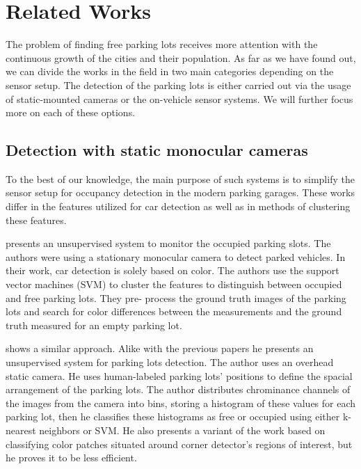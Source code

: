 \chapter{Related Works}
\label{cha:related_works}

The problem of finding free parking lots receives more attention with the
continuous growth of the cities and their population. As far as we have found
out, we can divide the works in the field in two main categories depending on
the sensor setup. The detection of the parking lots is either carried out via
the usage of static-mounted cameras or the on-vehicle sensor systems. We will
further focus more on each of these options.

\section{Detection with static monocular cameras} %
\label{sec:detection_with_monocular_cameras}

To the best of our knowledge, the main purpose of such systems is to simplify
the sensor setup for occupancy detection in the modern parking garages. These
works differ in the features utilized for car detection as well as in methods
of clustering these features.

\cite{qizhang06} presents an unsupervised system to monitor the occupied
parking slots. The authors were using a stationary monocular camera to detect
parked vehicles. In their  work, car detection is solely
based on color. The authors use the support vector machines (SVM) to cluster
the features to distinguish between occupied and free parking lots. They pre-
process the ground truth images of the parking lots and search for color
differences between the measurements and the ground truth measured for an
empty parking lot.

\cite{nicolastrue} shows a similar approach. Alike with the previous papers he
presents an unsupervised system for parking lots detection. The author uses an
overhead static camera. He uses human-labeled parking lots' positions to
define the spacial arrangement of the parking lots. The author distributes
chrominance channels of the images from the camera into bins, storing a
histogram of these values for each parking lot, then he classifies these
histograms as free or occupied using either k-nearest neighbors or SVM\@. He
also presents a variant of the work based on classifying color patches
situated around corner detector's regions of interest, but he proves it to be
less efficient.

